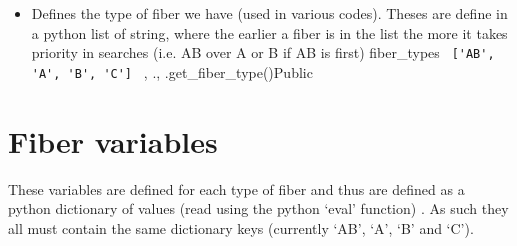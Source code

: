 \begin{itemize}
\item {} 
{Defines the type of fiber we have (used in various codes). Theses are define in a python list of string, where the earlier a fiber is in the list the more it takes priority in searches (i.e. AB over A or B if AB is first)}
{fiber\_types}
{\lstinline[style=pythoninline]| ['AB', 'A', 'B', 'C'] |}
{\calextractRAW, \calDRIFTE}{\constantsfile}{\calextractRAW.\progMAIN, \spirouStartup.get\_fiber\_type()}{Public}


\end{itemize}






\clearpage
\newpage
\section{Fiber variables}
\label{ch:variables:fiber}

These variables are defined for each type of fiber and thus are defined as a python dictionary of values \ifdevguide (read using the python `eval' function) \fi. As such they all must contain the same dictionary keys (currently `AB', `A', `B' and `C'). 



